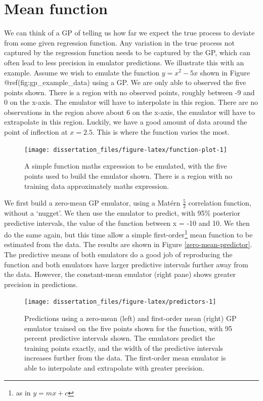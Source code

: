 \documentclass[
  12pt,
  a4paper,
  twoside]{book}
\begin{document}
\hypertarget{mean}{%
\section{Mean function}\label{mean}}

We can think of a GP of telling us how far we expect the true process to deviate from some given regression function. Any variation in the true process not captured by the regression function needs to be captured by the GP, which can often lead to less precision in emulator predictions. We illustrate this with an example. Assume we wish to emulate the function \(y=x^2 - 5x\) shown in Figure @ref(fig:gp\_example\_data) using a GP. We are only able to observed the five points shown. There is a region with no observed points, roughly between -9 and 0 on the x-axis. The emulator will have to interpolate in this region. There are no observations in the region above about 6 on the x-axis, the emulator will have to extrapolate in this region. Luckily, we have a good amount of data around the point of inflection at \(x=2.5\). This is where the function varies the most.

\begin{figure}[H]

{\centering \texttt{[image: dissertation\_files/figure-latex/function-plot-1]} 

}

\caption{A simple function maths expression to be emulated, with the five points used to build the emulator shown. There is a region with no training data approximately maths expression.}\label{fig:function-plot}
\end{figure}

We first build a zero-mean GP emulator, using a Matérn \(\frac{5}{2}\) correlation function, without a `nugget'. We then use the emulator to predict, with 95\% posterior predictive intervals, the value of the function between x = -10 and 10. We then do the same again, but this time allow a simple first-order\footnote{as in \(y=mx+c\)} mean function to be estimated from the data. The results are shown in Figure \ref{zero-mean-predictor}. The predictive means of both emulators do a good job of reproducing the function and both emulators have larger predictive intervals further away from the data. However, the constant-mean emulator (right pane) shows greater precision in predictions.

\begin{figure}[H]

{\centering \texttt{[image: dissertation\_files/figure-latex/predictors-1]} 

}

\caption{Predictions using a zero-mean (left) and first-order mean (right) GP emulator trained on the five points shown for the function, with 95 percent predictive intervals shown. The emulators predict the training points exactly, and the width of the predictive intervals increases further from the data. The first-order mean emulator is able to interpolate and extrapolate with greater precision.}\label{fig:predictors}
\end{figure}
\end{document}
